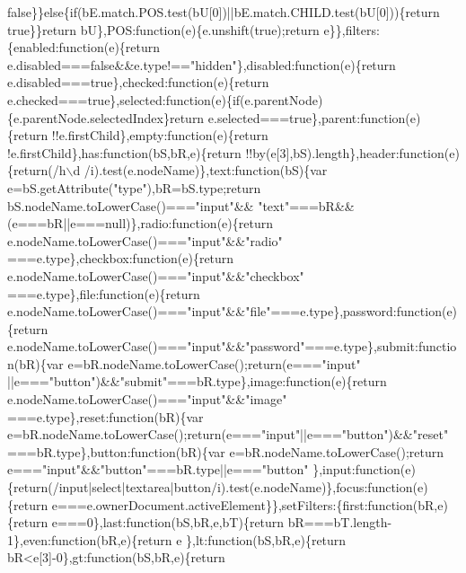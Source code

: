 \begin{DoxyCode}
{       false\}\}else\{if(bE.match.POS.test(bU[0])||bE.match.CHILD.test(bU[0]))\{return true\}\}return bU\},POS:function(e)\{e.unshift(true);return
       e\}\},filters:\{enabled:function(e)\{return e.disabled===false&&e.type!=="}hidden\textcolor{stringliteral}{"\},disabled:function(e)\{return
       e.disabled===true\},checked:function(e)\{return
       e.checked===true\},selected:function(e)\{if(e.parentNode)\{e.parentNode.selectedIndex\}return e.selected===true\},parent:function(e)\{return !!e.firstChild\},empty:function(e)\{return
       !e.firstChild\},has:function(bS,bR,e)\{return !!by(e[3],bS).length\},header:function(e)\{return(/h\(\backslash\)d
      /i).test(e.nodeName)\},text:function(bS)\{var e=bS.getAttribute("}type\textcolor{stringliteral}{"),bR=bS.type;return bS.nodeName.toLowerCase()==="}input\textcolor{stringliteral}{"&&
      "}text\textcolor{stringliteral}{"===bR&&(e===bR||e===null)\},radio:function(e)\{return e.nodeName.toLowerCase()==="}input\textcolor{stringliteral}{"&&"}radio\textcolor{stringliteral}{"
      ===e.type\},checkbox:function(e)\{return e.nodeName.toLowerCase()==="}input\textcolor{stringliteral}{"&&"}checkbox\textcolor{stringliteral}{"
      ===e.type\},file:function(e)\{return e.nodeName.toLowerCase()==="}input\textcolor{stringliteral}{"&&"}file\textcolor{stringliteral}{"===e.type\},password:function(e)\{return
       e.nodeName.toLowerCase()==="}input\textcolor{stringliteral}{"&&"}password\textcolor{stringliteral}{"===e.type\},submit:function(bR)\{var e=bR.nodeName.toLowerCase();return(e==="}input\textcolor{stringliteral}{"
      ||e==="}button\textcolor{stringliteral}{")&&"}submit\textcolor{stringliteral}{"===bR.type\},image:function(e)\{return e.nodeName.toLowerCase()==="}input\textcolor{stringliteral}{"&&"}image\textcolor{stringliteral}{"
      ===e.type\},reset:function(bR)\{var e=bR.nodeName.toLowerCase();return(e==="}input\textcolor{stringliteral}{"||e==="}button\textcolor{stringliteral}{")&&"}reset\textcolor{stringliteral}{"
      ===bR.type\},button:function(bR)\{var e=bR.nodeName.toLowerCase();return e==="}input\textcolor{stringliteral}{"&&"}button\textcolor{stringliteral}{"===bR.type||e==="}button\textcolor{stringliteral}{"
      \},input:function(e)\{return(/input|select|textarea|button/i).test(e.nodeName)\},focus:function(e)\{return
       e===e.ownerDocument.activeElement\}\},setFilters:\{first:function(bR,e)\{return e===0\},last:function(bS,bR,e,bT)\{return
       bR===bT.length-1\},even:function(bR,e)\{return e%
\textcolor{stringliteral}{\},lt:function(bS,bR,e)\{return bR<e[3]-0\},gt:function(bS,bR,e)\{return
}}
\end{DoxyCode}
